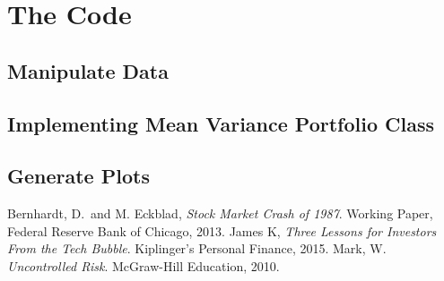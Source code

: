 \documentclass[10 pt]{hwtemplate} %
\begin{document}
\appendix
\section{The Code}
\subsection{Manipulate Data}

\newpage
\subsection{Implementing Mean Variance Portfolio Class}

\newpage
\subsection{Generate Plots}



\begin{thebibliography}{}
Bernhardt, D. and M. Eckblad,
\textit{Stock Market Crash of 1987}. Working Paper, Federal Reserve Bank of Chicago, 2013.
James K,
\textit{Three Lessons for Investors From the Tech Bubble}. Kiplinger's Personal Finance, 2015.
Mark, W.
\textit{Uncontrolled Risk}. McGraw-Hill Education, 2010.
\end{thebibliography}
\end{document}
